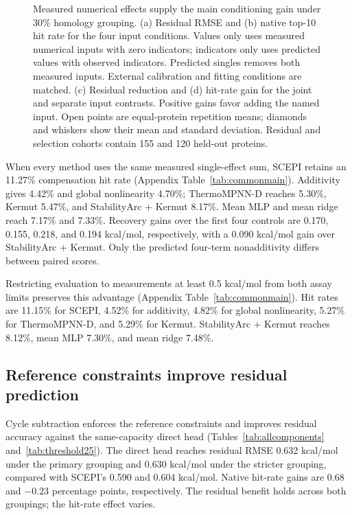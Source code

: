 \documentclass{llncs}
\begin{document}
\begin{figure}[!t]
\caption{Measured numerical effects supply the main conditioning gain under 30\% homology grouping. (a) Residual RMSE and (b) native top-10 hit rate for the four input conditions. Values only uses measured numerical inputs with zero indicators; indicators only uses predicted values with observed indicators. Predicted singles removes both measured inputs. External calibration and fitting conditions are matched. (c) Residual reduction and (d) hit-rate gain for the joint and separate input contrasts. Positive gains favor adding the named input. Open points are equal-protein repetition means; diamonds and whiskers show their mean and standard deviation. Residual and selection cohorts contain 155 and 120 held-out proteins.}
\label{fig:components}
\end{figure}

When every method uses the same measured single-effect sum, SCEPI retains an 11.27\% compensation hit rate (Appendix Table~\ref{tab:commonmain}). Additivity gives 4.42\% and global nonlinearity 4.70\%; ThermoMPNN-D reaches 5.30\%, Kermut 5.47\%, and StabilityArc + Kermut 8.17\%. Mean MLP and mean ridge reach 7.17\% and 7.33\%. Recovery gains over the first four controls are 0.170, 0.155, 0.218, and 0.194 kcal/mol, respectively, with a 0.090 kcal/mol gain over StabilityArc + Kermut. Only the predicted four-term nonadditivity differs between paired scores.

Restricting evaluation to measurements at least 0.5 kcal/mol from both assay limits preserves this advantage (Appendix Table~\ref{tab:commonmain}). Hit rates are 11.15\% for SCEPI, 4.52\% for additivity, 4.82\% for global nonlinearity, 5.27\% for ThermoMPNN-D, and 5.29\% for Kermut. StabilityArc + Kermut reaches 8.12\%, mean MLP 7.30\%, and mean ridge 7.48\%.

\subsection{Reference constraints improve residual prediction}

Cycle subtraction enforces the reference constraints and improves residual accuracy against the same-capacity direct head (Tables~\ref{tab:allcomponents} and~\ref{tab:threshold25}). The direct head reaches residual RMSE 0.632 kcal/mol under the primary grouping and 0.630 kcal/mol under the stricter grouping, compared with SCEPI's 0.590 and 0.604 kcal/mol. Native hit-rate gains are 0.68 and $-0.23$ percentage points, respectively. The residual benefit holds across both groupings; the hit-rate effect varies.
\end{document}
